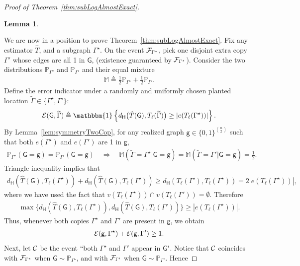 \documentclass[12pt]{article}
\newtheorem{lemma}{Lemma}
\newcommand{\Ind}{\mathbbm{1}}
\newcommand {\pr} {\mathbb{P}}
\newcommand{\calC}{{\cal C}}
\newcommand{\calE}{{\cal E}}
\newcommand{\calF}{{\cal F}}
\newcommand{\s}[1]{\mathsf{#1}}
\begin{document}
\begin{proof}[Proof of Theorem~\ref{thm:subLogAlmostExact}]
\begin{lemma}
\end{lemma}
We are now in a position to prove Theorem~\ref{thm:subLogAlmostExact}. Fix any estimator $\hat{T}$, and a subgraph $\Gamma^\star$. On the event $\calF_{\Gamma^\star}$, pick one disjoint extra copy $\Gamma'$ whose edges are all 1 in $\s{G}$, (existence guaranteed by $\calF_{\Gamma^\star}$). Consider the two distributions $\pr_{\Gamma^\star}$ and $\pr_{\Gamma'}$ and their equal mixture
\begin{align}
\mathbb{M}\triangleq\frac{1}{2} \pr_{\Gamma^\star} + \frac{1}{2} \pr_{\Gamma'} .
\end{align}
Define the error indicator under a randomly and uniformly chosen planted location $\widetilde{\Gamma}\in\{\Gamma^\star,\Gamma'\}$:
\begin{align}
\calE(\s{G},\widetilde{\Gamma})\triangleq\Ind\left\{d_{\s{H}}\big(\hat T(\s{G}),T_\ell(\widetilde{\Gamma})\big)\geq|e(T_\ell(\Gamma^\star))|\right\}.
\end{align}
By Lemma~\ref{lem:symmetryTwoCop}, for any realized graph $\s{g}\in\{0,1\}^{\binom{n}{2}}$ such that both $e(\Gamma^\star)$ and $e(\Gamma')$ are 1 in $\s{g}$,
\begin{align}
\pr_{\Gamma^\star}(\s{G}=\s{g})=\pr_{\Gamma'}(\s{G}=\s{g})\quad\Longrightarrow\quad
\mathbb{M}(\widetilde{\Gamma}=\Gamma^\star\vert \s{G}=\s{g})=\mathbb{M}(\widetilde{\Gamma}=\Gamma'\vert \s{G}=\s{g})=\frac{1}{2}.
\end{align}
Triangle inequality implies that
\begin{align}
d_{\s{H}}(\hat T(\s{G}),T_\ell(\Gamma^\star))+d_{\s{H}}(\hat T(\s{G}),T_\ell(\Gamma'))\geq d_{\s{H}}(T_\ell(\Gamma'),T_\ell(\Gamma^\star)) = 2|e(T_\ell(\Gamma^\star))|,
\end{align}
where we have used the fact that $v(T_\ell(\Gamma^\star))\cap v(T_\ell(\Gamma'))=\emptyset$. Therefore
\begin{align}
\max\{d_{\s{H}}(\hat T(\s{G}),T_\ell(\Gamma^\star)),d_{\s{H}}(\hat T(\s{G}),T_\ell(\Gamma'))\}\geq |e(T_\ell(\Gamma^\star))|.
\end{align}
Thus, whenever both copies $\Gamma^\star$ and $\Gamma'$ are present in $\s{g}$, we obtain
\begin{align}
    \calE(\s{g},\Gamma^\star)+\calE(\s{g},\Gamma')\geq1.\label{eqn:LLB1SumE}
\end{align}
Next, let $\calC$ be the event ``both $\Gamma^\star$ and $\Gamma'$ appear in $\s{G}$". Notice that $\calC$ coincides with $\calF_{\Gamma^\star}$ when $\s{G}\sim\pr_{\Gamma^\star}$, and with $\calF_{\Gamma'}$ when $\s{G}\sim\pr_{\Gamma'}$. Hence

\end{proof}
\end{document}

